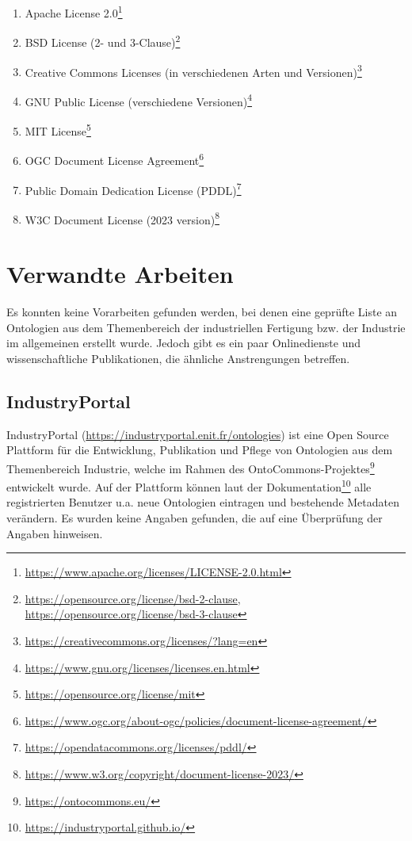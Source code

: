 \documentclass{article}
\begin{document}
\begin{enumerate}
    \item Apache License 2.0\footnote{\url{https://www.apache.org/licenses/LICENSE-2.0.html}}
    \item BSD License (2- und 3-Clause)\footnote{\url{https://opensource.org/license/bsd-2-clause}, \url{https://opensource.org/license/bsd-3-clause}}
    \item Creative Commons Licenses (in verschiedenen Arten und Versionen)\footnote{\url{https://creativecommons.org/licenses/?lang=en}}
    \item GNU Public License (verschiedene Versionen)\footnote{\url{https://www.gnu.org/licenses/licenses.en.html}}
    \item MIT License\footnote{\url{https://opensource.org/license/mit}}
    \item OGC Document License Agreement\footnote{\url{https://www.ogc.org/about-ogc/policies/document-license-agreement/}}
    \item Public Domain Dedication License (PDDL)\footnote{\url{https://opendatacommons.org/licenses/pddl/}}
    \item W3C Document License (2023 version)\footnote{\url{https://www.w3.org/copyright/document-license-2023/}}
\end{enumerate}


\section{Verwandte Arbeiten}

Es konnten keine Vorarbeiten gefunden werden, bei denen eine geprüfte Liste an Ontologien aus dem Themenbereich der industriellen Fertigung bzw. der Industrie im allgemeinen erstellt wurde.
Jedoch gibt es ein paar Onlinedienste und wissenschaftliche Publikationen, die ähnliche Anstrengungen betreffen.

\subsection{IndustryPortal}

IndustryPortal \cite{amdouni2023industryportal} (\url{https://industryportal.enit.fr/ontologies}) ist eine Open Source Plattform für die Entwicklung, Publikation und Pflege von Ontologien aus dem Themenbereich Industrie, welche im Rahmen des OntoCommons-Projektes\footnote{\url{https://ontocommons.eu/}} entwickelt wurde.
Auf der Plattform können laut der Dokumentation\footnote{\url{https://industryportal.github.io/}} alle registrierten Benutzer u.a. neue Ontologien eintragen und bestehende Metadaten verändern.
Es wurden keine Angaben gefunden, die auf eine Überprüfung der Angaben hinweisen.
\end{document}
